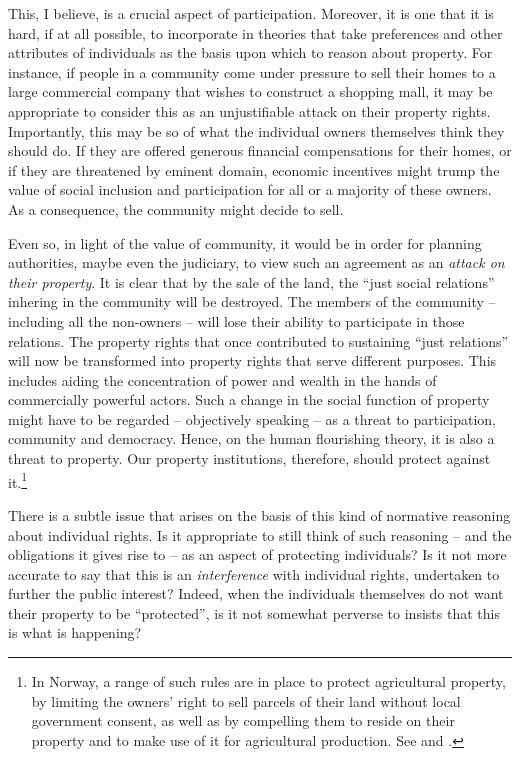This, I believe, is a crucial aspect of participation. Moreover, it is one that it is hard, if at all possible, to incorporate in theories that take preferences and other attributes of individuals as the basis upon which to reason about property. For instance, if people in a community come under pressure to sell their homes to a large commercial company that wishes to construct a shopping mall, it may be appropriate to consider this as an unjustifiable attack on their property rights. Importantly, this may be so  of what the individual owners themselves think they should do. If they are offered generous financial compensations for their homes, or if they are threatened by eminent domain, economic incentives might trump the value of social inclusion and participation for all or a majority of these owners. As a consequence, the community might decide to sell.  

Even so, in light of the value of community, it would be in order for planning authorities, maybe even the judiciary, to view such an agreement as an {\it attack on their property}. It is clear that by the sale of the land, the ``just social relations'' inhering in the community will be destroyed. The members of the community -- including all the non-owners -- will lose their ability to participate in those relations. The property rights that once contributed to sustaining ``just relations'' will now be transformed into property rights that serve different purposes. This includes aiding the concentration of power and wealth in the hands of commercially powerful actors. Such a change in the social function of property might have to be regarded -- objectively speaking -- as a threat to participation, community and democracy. Hence, on the human flourishing theory, it is also a threat to property. Our property institutions, therefore, should protect against it.\footnote{In Norway, a range of such rules are in place to protect agricultural property, by limiting the owners' right to sell parcels of their land without local government consent, as well as by compelling them to reside on their property and to make use of it for agricultural production. See \cite[8|12]{la95} and \cite[4|5]{lca03}.}

There is a subtle issue that arises on the basis of this kind of normative reasoning about individual rights. Is it appropriate to still think of such reasoning -- and the obligations it gives rise to -- as an aspect of protecting individuals? Is it not more accurate to say that this is an {\it interference} with individual rights, undertaken to further the public interest? Indeed, when the individuals themselves do not want their property to be ``protected'', is it not somewhat perverse to insists that this is what is happening? 

